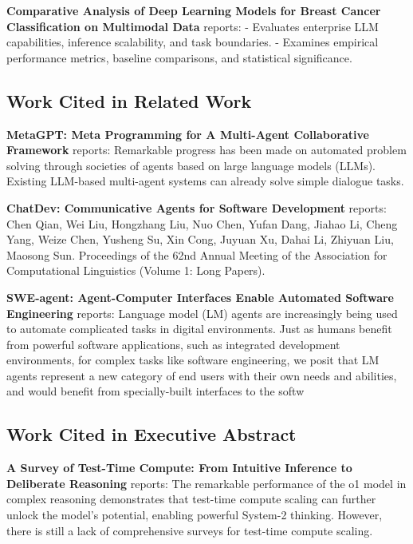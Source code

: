 \documentclass[10pt,journal,compsoc,twocolumn]{IEEEtran}
\begin{document}
\textbf{Comparative Analysis of Deep Learning Models for Breast Cancer Classification on Multimodal Data} \cite{crossref_10_1145_3689096_3689462} reports: - Evaluates enterprise LLM capabilities, inference scalability, and task boundaries. - Examines empirical performance metrics, baseline comparisons, and statistical significance.


\subsection{Work Cited in Related Work}


\textbf{MetaGPT: Meta Programming for A Multi-Agent Collaborative Framework} \cite{crossref_10_48550_arxiv_2308_00352} reports: Remarkable progress has been made on automated problem solving through societies of agents based on large language models (LLMs). Existing LLM-based multi-agent systems can already solve simple dialogue tasks.

\textbf{ChatDev: Communicative Agents for Software Development} \cite{crossref_10_18653_v1_2024_acl_long_810} reports: Chen Qian, Wei Liu, Hongzhang Liu, Nuo Chen, Yufan Dang, Jiahao Li, Cheng Yang, Weize Chen, Yusheng Su, Xin Cong, Juyuan Xu, Dahai Li, Zhiyuan Liu, Maosong Sun. Proceedings of the 62nd Annual Meeting of the Association for Computational Linguistics (Volume 1: Long Papers).

\textbf{SWE-agent: Agent-Computer Interfaces Enable Automated Software Engineering} \cite{crossref_10_48550_arxiv_2405_15793} reports: Language model (LM) agents are increasingly being used to automate complicated tasks in digital environments. Just as humans benefit from powerful software applications, such as integrated development environments, for complex tasks like software engineering, we posit that LM agents represent a new category of end users with their own needs and abilities, and would benefit from specially-built interfaces to the softw


\subsection{Work Cited in Executive Abstract}


\textbf{A Survey of Test-Time Compute: From Intuitive Inference to Deliberate Reasoning} \cite{arxiv_2501_02497} reports: The remarkable performance of the o1 model in complex reasoning demonstrates that test-time compute scaling can further unlock the model's potential, enabling powerful System-2 thinking. However, there is still a lack of comprehensive surveys for test-time compute scaling.
\end{document}
